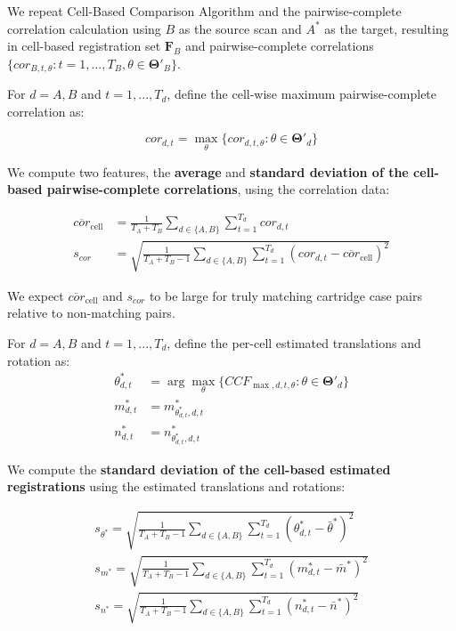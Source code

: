 \documentclass[11pt,]{isuthesis}
\begin{document}
We repeat Cell-Based Comparison Algorithm and the pairwise-complete correlation calculation using \(B\) as the source scan and \(A^*\) as the target, resulting in cell-based registration set \(\pmb{F}_B\) and pairwise-complete correlations \(\{cor_{B,t,\theta} : t = 1,...,T_B, \theta \in \pmb{\Theta}'_B\}\).

For \(d = A,B\) and \(t = 1,...,T_d\), define the cell-wise maximum pairwise-complete correlation as:

\[
cor_{d,t} = \max_{\theta} \{cor_{d,t,\theta} : \theta \in \pmb{\Theta}'_d\}
\]

We compute two features, the \textbf{average} and \textbf{standard deviation of the cell-based pairwise-complete correlations}, using the correlation data:

\begin{align*}
\overline{cor}_{\text{cell}} &= \frac{1}{T_A + T_B} \sum_{d \in \{A,B\}} \sum_{t=1}^{T_d} cor_{d,t} \\
s_{cor} &= \sqrt{\frac{1}{T_A + T_B - 1} \sum_{d \in \{A,B\}} \sum_{t=1}^{T_d} (cor_{d,t} - \overline{cor}_{\text{cell}})^2}
\end{align*}

We expect \(\overline{cor}_{\text{cell}}\) and \(s_{cor}\) to be large for truly matching cartridge case pairs relative to non-matching pairs.

For \(d = A,B\) and \(t = 1,...,T_d\), define the per-cell estimated translations and rotation as:
\begin{align*}
\theta^*_{d,t} &= \arg \max_{\theta} \{CCF_{\max,d,t,\theta} : \theta \in \pmb{\Theta}'_d\} \\
m^*_{d,t} &= m^*_{\theta^*_{d,t},d,t} \\
n^*_{d,t} &= n^*_{\theta^*_{d,t},d,t}
\end{align*}

We compute the \textbf{standard deviation of the cell-based estimated registrations} using the estimated translations and rotations:

\begin{align*}
s_{\theta^*} =  \sqrt{\frac{1}{T_A + T_B - 1} \sum_{d \in \{A,B\}} \sum_{t=1}^{T_d} (\theta^*_{d,t} - \bar{\theta}^*)^2} \\
s_{m^*} =  \sqrt{\frac{1}{T_A + T_B - 1} \sum_{d \in \{A,B\}} \sum_{t=1}^{T_d} (m^*_{d,t} - \bar{m}^*)^2} \\
s_{n^*} = \sqrt{\frac{1}{T_A + T_B - 1} \sum_{d \in \{A,B\}} \sum_{t=1}^{T_d} (n^*_{d,t} - \bar{n}^*)^2}
\end{align*}
\end{document}
